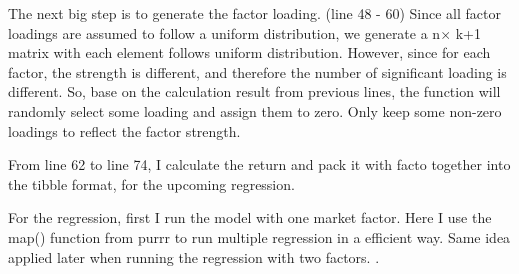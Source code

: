 \documentclass[12pt]{article}
\begin{document}
The next big step is to generate the factor loading. (line 48 - 60)
Since all factor loadings are assumed to follow a uniform distribution, we generate a n$\times$ k+1 matrix with each element follows uniform distribution. However, since for each factor, the strength is different, and therefore the number of significant loading is different. So, base on the calculation result from previous lines, the function will randomly select some loading and assign them to zero. Only keep some non-zero loadings to reflect the factor strength.

From line 62 to line 74, I calculate the return and pack it with facto together into the tibble format, for the upcoming regression.

For the regression, first I run the model with one market factor. Here I use the map() function from purrr to run multiple regression in a efficient way. Same idea applied later when running the regression with two factors. 
.
\end{document}
